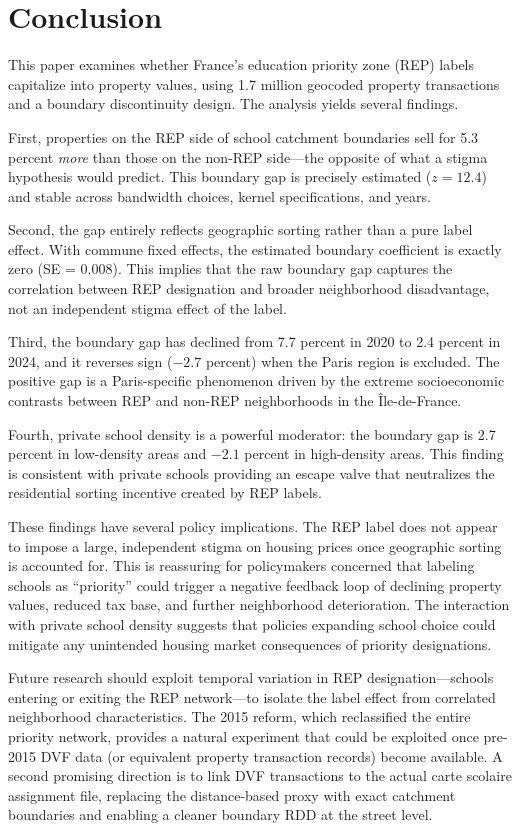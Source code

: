 \documentclass[12pt]{article}
\begin{document}
\section{Conclusion}\label{sec:conclusion}

This paper examines whether France's education priority zone (REP) labels capitalize into property values, using 1.7 million geocoded property transactions and a boundary discontinuity design. The analysis yields several findings.

First, properties on the REP side of school catchment boundaries sell for 5.3 percent \textit{more} than those on the non-REP side---the opposite of what a stigma hypothesis would predict. This boundary gap is precisely estimated ($z = 12.4$) and stable across bandwidth choices, kernel specifications, and years.

Second, the gap entirely reflects geographic sorting rather than a pure label effect. With commune fixed effects, the estimated boundary coefficient is exactly zero (SE = 0.008). This implies that the raw boundary gap captures the correlation between REP designation and broader neighborhood disadvantage, not an independent stigma effect of the label.

Third, the boundary gap has declined from 7.7 percent in 2020 to 2.4 percent in 2024, and it reverses sign ($-2.7$ percent) when the Paris region is excluded. The positive gap is a Paris-specific phenomenon driven by the extreme socioeconomic contrasts between REP and non-REP neighborhoods in the \^{I}le-de-France.

Fourth, private school density is a powerful moderator: the boundary gap is 2.7 percent in low-density areas and $-2.1$ percent in high-density areas. This finding is consistent with private schools providing an escape valve that neutralizes the residential sorting incentive created by REP labels.

These findings have several policy implications. The REP label does not appear to impose a large, independent stigma on housing prices once geographic sorting is accounted for. This is reassuring for policymakers concerned that labeling schools as ``priority'' could trigger a negative feedback loop of declining property values, reduced tax base, and further neighborhood deterioration. The interaction with private school density suggests that policies expanding school choice could mitigate any unintended housing market consequences of priority designations.

Future research should exploit temporal variation in REP designation---schools entering or exiting the REP network---to isolate the label effect from correlated neighborhood characteristics. The 2015 reform, which reclassified the entire priority network, provides a natural experiment that could be exploited once pre-2015 DVF data (or equivalent property transaction records) become available. A second promising direction is to link DVF transactions to the actual carte scolaire assignment file, replacing the distance-based proxy with exact catchment boundaries and enabling a cleaner boundary RDD at the street level.
\end{document}
